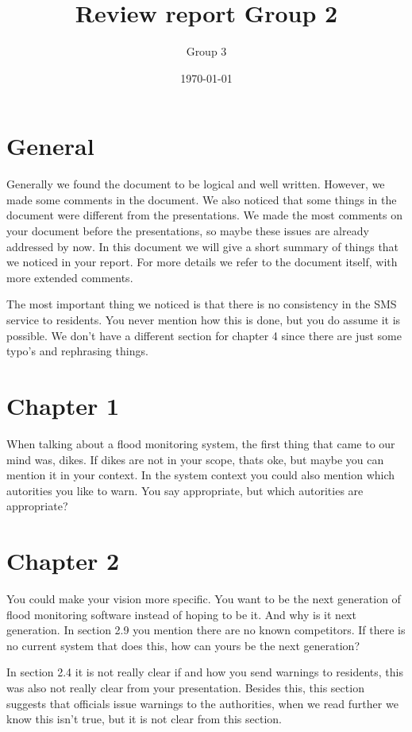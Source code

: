 \documentclass[a4paper,10pt]{article}
\author{Group 3}
\date{\today}
\title{Review report Group 2}
\begin{document}
\maketitle

\section{General}
Generally we found the document to be logical and well written. However, we made some comments in the document. We also noticed that some things in the document were different from the presentations. We made the most comments on your document before the presentations, so maybe these issues are already addressed by now. In this document we will give a short summary of things that we noticed in your report. For more details we refer to the document itself, with more extended comments. 

The most important thing we noticed is that there is no consistency in the SMS service to residents. You never mention how this is done, but you do assume it is possible. We don't have a different section for chapter 4 since there are just some typo's and rephrasing things. 

\section{Chapter 1}
When talking about a flood monitoring system, the first thing that came to our mind was, dikes. If dikes are not in your scope, thats oke, but maybe you can mention it in your context. In the system context you could also mention which autorities you like to warn. You say appropriate, but which autorities are appropriate?

\section{Chapter 2}
You could make your vision more specific. You want to be the next generation of flood monitoring software instead of hoping to be it. And why is it next generation. In section 2.9 you mention there are no known competitors. If there is no current system that does this, how can yours be the next generation? 

In section 2.4 it is not really clear if and how you send warnings to residents, this was also not really clear from your presentation. Besides this, this section suggests that officials issue warnings to the authorities, when we read further we know this isn't true, but it is not clear from this section.
\end{document}
